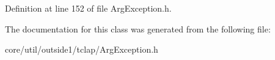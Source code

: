 Definition at line 152 of file Arg\+Exception.\+h.



The documentation for this class was generated from the following file\+:\begin{DoxyCompactItemize}
\item 
core/util/outside1/tclap/Arg\+Exception.\+h\end{DoxyCompactItemize}
